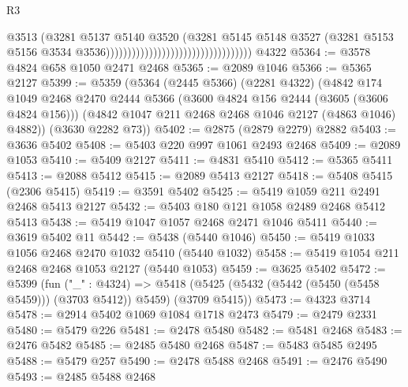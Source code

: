 \begin{lexlean}{R3}
\begin{coremodule}
                                                                  @3513
                                                                  (@3281
                                                                    @5137
                                                                    @5140
                                                                    @3520
                                                                    (@3281
                                                                      @5145
                                                                      @5148
                                                                      @3527
                                                                      (@3281
                                                                        @5153
                                                                        @5156
                                                                        @3534
                                                                        @3536))))))))))))))))))))))))))))))))))
    @4322
@5364 := @3578 @4824 @658 @1050 @2471 @2468
@5365 := @2089 @1046
@5366 := @5365 @2127
@5399 := @5359
    (@5364
      (@2445 @5366)
      (@2281 @4322)
      (@4842
        @174
        @1049
        @2468
        @2470
        @2444
        @5366
        (@3600 @4824 @156 @2444 (@3605 (@3606 @4824 @156)))
        (@4842 @1047 @211 @2468 @2468 @1046 @2127 (@4863 @1046) @4882))
      (@3630 @2282 @73))
@5402 := @2875 (@2879 @2279) @2882
@5403 := @3636 @5402
@5408 := @5403 @220 @997 @1061 @2493 @2468
@5409 := @2089 @1053
@5410 := @5409 @2127
@5411 := @4831 @5410
@5412 := @5365 @5411
@5413 := @2088 @5412
@5415 := @2089 @5413 @2127
@5418 := @5408 @5415 (@2306 @5415)
@5419 := @3591 @5402
@5425 := @5419 @1059 @211 @2491 @2468 @5413 @2127
@5432 := @5403 @180 @121 @1058 @2489 @2468 @5412 @5413
@5438 := @5419 @1047 @1057 @2468 @2471 @1046 @5411
@5440 := @3619 @5402 @11
@5442 := @5438 (@5440 @1046)
@5450 := @5419 @1033 @1056 @2468 @2470 @1032 @5410 (@5440 @1032)
@5458 := @5419 @1054 @211 @2468 @2468 @1053 @2127 (@5440 @1053)
@5459 := @3625 @5402
@5472 := @5399
    (fun ("_" : @4324) =>
    @5418 (@5425 (@5432 (@5442 (@5450 (@5458 @5459))) (@3703 @5412)) @5459) (@3709 @5415))
@5473 := @4323 @3714
@5478 := @2914 @5402 @1069 @1084 @1718 @2473
@5479 := @2479 @2331
@5480 := @5479 @226
@5481 := @2478 @5480
@5482 := @5481 @2468
@5483 := @2476 @5482
@5485 := @2485 @5480 @2468
@5487 := @5483 @5485 @2495
@5488 := @5479 @257
@5490 := @2478 @5488 @2468
@5491 := @2476 @5490
@5493 := @2485 @5488 @2468

\end{coremodule}
\end{lexlean}
